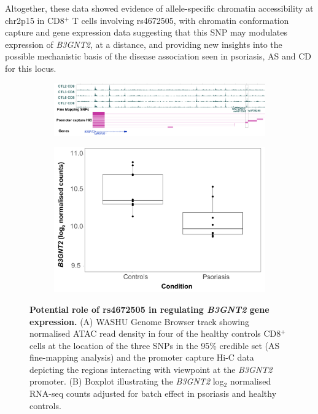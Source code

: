 Altogether, these data showed evidence of allele-specific chromatin accessibility at chr2p15 in CD8$^+$ T cells involving rs4672505, with chromatin conformation capture and gene expression data suggesting that this SNP may modulates expression of \textit{B3GNT2}, at a distance, and providing new insights into the possible mechanistic basis of the disease association seen in psoriasis, AS and CD for this locus.


\begin{figure}[htbp]
\centering
\begin{subfigure}{0.9\textwidth}
\centering
\includegraphics[width=\textwidth]{./Results2/pdfs/B3GNT2_HiC_WASHU_track}
\caption{\textbf{}}
\end{subfigure}
\begin{subfigure}{0.4\textwidth}
\centering
\includegraphics[width=\textwidth]{./Results2/pdfs/RNA_PS_CTL_B3GNT2_expression_CD8}
\caption{\textbf{}}
\end{subfigure}
\caption[Potential role of rs4672505 in regulating \textit{B3GNT2} gene expression.]{\textbf{Potential role of rs4672505 in regulating \textit{B3GNT2} gene expression.} (A) WASHU Genome Browser track showing normalised ATAC read density in four of the healthy controls CD8$^+$ cells at the location of the three SNPs in the 95\% credible set (AS fine-mapping analysis) and the promoter capture Hi-C data depicting the regions interacting with viewpoint at the \textit{B3GNT2} promoter. (B) Boxplot illustrating the \textit{B3GNT2} log$_2$ normalised RNA-seq counts adjusted for batch effect in psoriasis and healthy controls.}
\label{figure:RNA_chromatin_interaction_B3GNT2}
\end{figure} 






